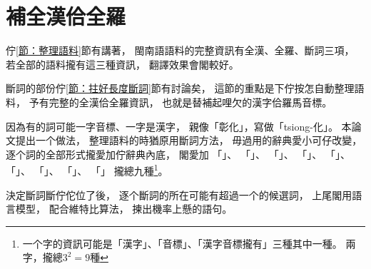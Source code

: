 
\section{補全漢佮全羅}
\label{節：補全漢佮全羅}
佇\ref{節：整理語料}節有講著，
閩南語語料的完整資訊有全漢、全羅、斷詞三項，
若全部的語料攏有這三種資訊，
翻譯效果會閣較好。

斷詞的部份佇\ref{節：拄好長度斷詞}節有討論矣，
這節的重點是下佇按怎自動整理語料，
予有完整的全漢佮全羅資訊，
也就是替補起哩欠的漢字佮羅馬音標。

因為有的詞可能一字音標、一字是漢字，
親像「彰化」，寫做「tsiong-化」。
本論文提出一个做法，
整理語料的時猶原用斷詞方法，
毋過用的辭典愛小可仔改變，
逐个詞的全部形式攏愛加佇辭典內底，
閣愛加
「」、
「」、
「」、
「」、
「」、
「」、
「」、
「」、
「」
攏總九種\footnote{一个字的資訊可能是「漢字」、「音標」、「漢字音標攏有」三種其中一種。
兩字，攏總$3^{2}=9$種}。


決定斷詞斷佇佗位了後，
逐个斷詞的所在可能有超過一个的候選詞，
上尾閣用語言模型，
配合維特比算法，
揀出機率上懸的語句。


